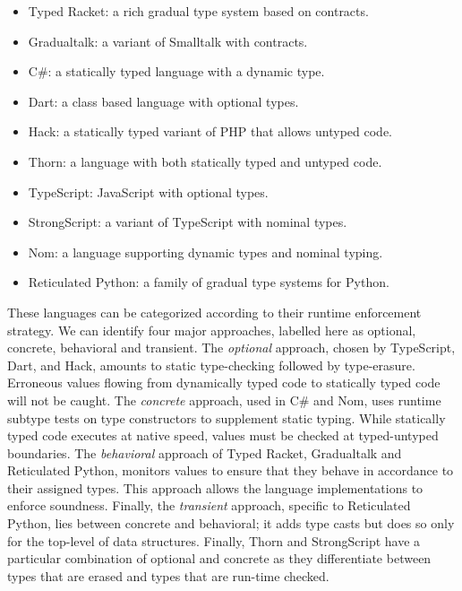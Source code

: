 \documentclass[USenglish]{tex/lipics-v2016}
\begin{document}
\begin{itemize}
 \item Typed Racket: a rich gradual type system based on contracts.
 \item Gradualtalk: a variant of Smalltalk with contracts.
 \item C\#: a statically typed language with a dynamic type.
 \item Dart: a class based language with optional types.
 \item Hack: a statically typed variant of PHP that allows untyped code.
 \item Thorn: a language with both statically typed and untyped code.
 \item TypeScript: JavaScript with optional types.
 \item StrongScript: a variant of TypeScript with nominal types.
 \item Nom: a language supporting dynamic types and nominal typing.
 \item Reticulated Python: a family of gradual type systems for Python.
\end{itemize}

\noindent These languages can be categorized according to their runtime
enforcement strategy. We can identify four major approaches, labelled here
as optional, concrete, behavioral and transient. The \emph{optional}
approach, chosen by TypeScript, Dart, and Hack, amounts to static
type-checking followed by type-erasure.  Erroneous values flowing from
dynamically typed code to statically typed code will not be caught. The
\emph{concrete} approach, used in C\# and Nom, uses runtime subtype tests on
type constructors to supplement static typing.  While statically typed code
executes at native speed, values must be checked at typed-untyped
boundaries. The \emph{behavioral} approach of Typed Racket, Gradualtalk and
Reticulated Python, monitors values to ensure that they behave in accordance
to their assigned types. This approach allows the language implementations
to enforce soundness. Finally, the \emph{transient} approach, specific to
Reticulated Python, lies between concrete and behavioral; it adds type casts
but does so only for the top-level of data structures. Finally, Thorn and
StrongScript have a particular combination of optional and concrete as they
differentiate between types that are erased and types that are run-time
checked.
\end{document}
